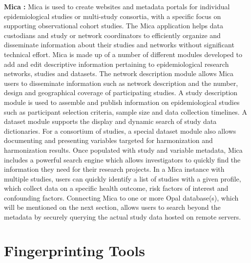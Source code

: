 \textbf{Mica \cite{mica}:}
Mica is used to create websites and metadata portals for individual epidemiological
studies or multi-study consortia, with a specific focus on supporting observational
cohort studies.
The Mica application helps data custodians and study or network coordinators to
efficiently organize and disseminate information about their studies and networks
without significant technical effort.
Mica is made up of a number of different modules developed to add and edit descriptive
information pertaining to epidemiological research networks, studies and datasets.
The network description module allows Mica users to disseminate information such as
network description and the number, design and geographical coverage of participating
studies.
A study description module is used to assemble and publish information on
epidemiological studies such as participant selection criteria, sample size and data
collection timelines.
A dataset module supports the display and dynamic search of study data dictionaries.
For a consortium of studies, a special dataset module also allows documenting and
presenting variables targeted for harmonization and harmonization results.
Once populated with study and variable metadata, Mica includes a powerful search engine
which allows investigators to quickly find the information they need for their research
projects.
In a Mica instance with multiple studies, users can quickly identify a list of studies
with a given profile, which collect data on a specific health outcome, risk factors of
interest and confounding factors.
Connecting Mica to one or more Opal database(s), which will be mentioned on the next
section, allows users to search beyond the metadata by securely querying the actual
study data hosted on remote servers.

%
%
%
%
%
%
%
%

\section{Fingerprinting Tools}

